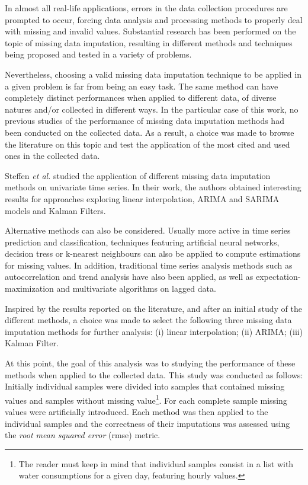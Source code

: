 \documentclass[9pt,journal,compsoc]{IEEEtran}
\begin{document}
In almost all real-life applications, errors in the data collection procedures are prompted to occur, forcing data analysis and processing methods to properly deal with missing and invalid values. Substantial research has been performed on the topic of missing data imputation, resulting in different methods and techniques being proposed and tested in a variety of problems.

Nevertheless, choosing a valid missing data imputation technique to be applied in a given problem is far from being an easy task. The same method can have completely distinct performances when applied to different data, of diverse natures and/or collected in different ways. In the particular case of this work, no previous studies of the performance of missing data imputation methods had been conducted on the collected data. As a result, a choice was made to browse the literature on this topic and test the application of the most cited and used ones in the collected data.

Steffen \emph{et al.}\cite{moritz2015comparison} studied the application of different missing data imputation methods on univariate time series. In their work, the authors obtained interesting results for approaches exploring linear interpolation, ARIMA and SARIMA models and Kalman Filters. 

Alternative methods can also be considered. Usually more active in time series prediction and classification, techniques featuring artificial neural networks, decision tress or k-nearest neighbours\cite{troyanskaya2001missing, yu2014short} can also be applied to compute estimations for missing values. In addition, traditional time series analysis methods such as autocorrelation and trend analysis have also been applied\cite{abreu2012using}, as well as expectation-maximization and multivariate algorithms on lagged data\cite{moritz2015comparison}.

Inspired by the results reported on the literature, and after an initial study of the different methods, a choice was made to select the following three missing data imputation methods for further analysis: (i) linear interpolation; (ii) ARIMA; (iii) Kalman Filter.

At this point, the goal of this analysis was to studying the performance of these methods when applied to the collected data. This study was conducted as follows: Initially individual samples were divided into samples that contained missing values and samples without missing value\footnote{The reader must keep in mind that individual samples consist in a list with water consumptions for a given day, featuring hourly values.}. For each complete sample missing values were artificially introduced. Each method was then applied to the individual samples and the correctness of their imputations was assessed using the \emph{root mean squared error} (rmse) metric.
\end{document}
